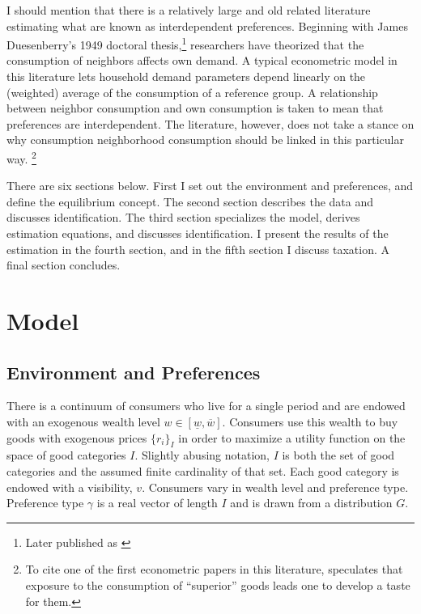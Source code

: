 \documentclass{article}
\begin{document}
I should mention that there is a relatively large and old related literature estimating what are known as interdependent preferences.  Beginning with James Duesenberry's 1949 doctoral thesis,\footnote{Later published as \citep{Duesenberry1949}} researchers have theorized that the consumption of neighbors affects own demand.  A typical econometric model in this literature lets household demand parameters depend linearly on the (weighted) average of the consumption of a reference group. A relationship between neighbor consumption and own consumption is taken to mean that preferences are interdependent.  The literature, however, does not take a stance on why consumption neighborhood consumption should be linked in this particular way. \footnote{To cite one of the first econometric papers in this literature, \citet{Pollak1976} speculates that exposure to the consumption of ``superior'' goods leads one to develop a taste for them.}  

There are six sections below.  First I set out the environment and preferences, and define the equilibrium concept.  The second section describes the data and discusses identification.  The third section specializes the model, derives estimation equations, and discusses identification.  I present the results of the estimation in the fourth section, and in the fifth section I discuss taxation.  A final section concludes. 

\section{Model}
\subsection{Environment and Preferences}
There is a continuum of consumers who live for a single period and are endowed with an exogenous wealth level $w \in \left[ \underline{w},\overline{w} \right]$.
Consumers use this wealth to buy goods with exogenous prices $\{r_i\}_I$ in order to maximize a utility function on the space of good categories $I$. 
Slightly abusing notation, $I$ is both the set of good categories and the assumed finite cardinality of that set.
Each good category is endowed with a visibility, $v$.
Consumers vary in wealth level and preference type.
Preference type $\gamma$ is a real vector of length $I$ and is  drawn from a distribution $G$.
\end{document}

